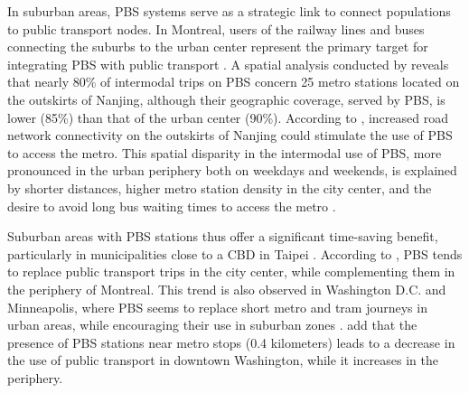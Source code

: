 \begin{refsegment}
In suburban areas, \acrshort{PBS} systems serve as a strategic link to connect populations to public transport nodes. In Montreal, users of the railway lines and buses connecting the suburbs to the urban center represent the primary target for integrating \acrshort{PBS} with public transport \textcolor{blue}{\autocite[116]{bachand-marleau_much-anticipated_2011}}. A spatial analysis conducted by \textcolor{blue}{\textcite[9]{ma_measuring_2018}} reveals that nearly 80\% of intermodal trips on \acrshort{PBS} concern 25 metro stations located on the outskirts of Nanjing, although their geographic coverage, served by \acrshort{PBS}, is lower (85\%) than that of the urban center (90\%). According to \textcolor{blue}{\textcite[17]{ji_exploring_2018}}, increased road network connectivity on the outskirts of Nanjing could stimulate the use of \acrshort{PBS} to access the metro. This spatial disparity in the intermodal use of \acrshort{PBS}, more pronounced in the urban periphery both on weekdays and weekends, is explained by shorter distances, higher metro station density in the city center, and the desire to avoid long bus waiting times to access the metro \textcolor{blue}{\autocite[67]{ma_understanding_2018}}.%

Suburban areas with \acrshort{PBS} stations thus offer a significant time-saving benefit, particularly in municipalities close to a \acrshort{CBD} in Taipei \textcolor{blue}{\autocite[11]{yen_how_2023}}. According to \textcolor{blue}{\textcite[478, 482]{tarpin-pitre_typology_2020}}, \acrshort{PBS} tends to replace public transport trips in the city center, while complementing them in the periphery of Montreal. This trend is also observed in Washington D.C. and Minneapolis, where \acrshort{PBS} seems to replace short metro and tram journeys in urban areas, while encouraging their use in suburban zones \textcolor{blue}{\autocite[320-321]{martin_evaluating_2014}}. \textcolor{blue}{\textcite[376]{ma_estimating_2019}} add that the presence of \acrshort{PBS} stations near metro stops (0.4 kilometers) leads to a decrease in the use of public transport in downtown Washington, while it increases in the periphery.%


\end{refsegment}
